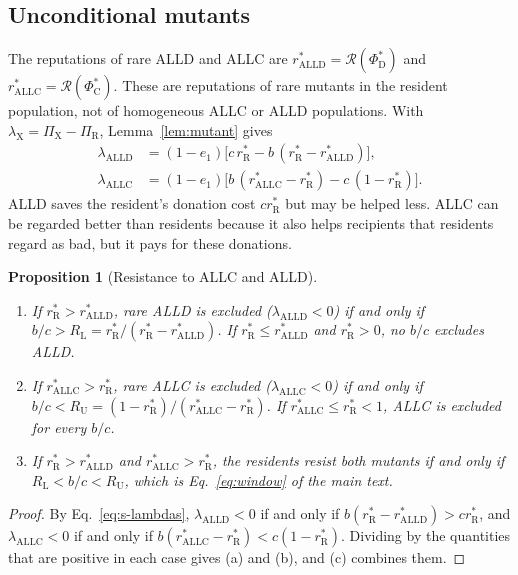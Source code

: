 \documentclass[10pt]{wlscirep}
\newcommand{\Rmap}{\mathscr{R}}            %
\newcommand{\rR}{r_{\mathrm{R}}^{*}}
\newcommand{\PhiCs}{\Phi^{*}_{\mathrm{C}}}
\newcommand{\PhiDs}{\Phi^{*}_{\mathrm{D}}}
\newcommand{\ALLC}{\mathrm{ALLC}}
\newcommand{\ALLD}{\mathrm{ALLD}}
\theoremstyle{plain}
\newtheorem{proposition}[lemma]{Proposition}
\theoremstyle{remark}
\begin{document}
\subsection{Unconditional mutants}
\label{si:unconditional}

The reputations of rare ALLD and ALLC are $r^*_{\ALLD}=\Rmap(\PhiDs)$ and $r^*_{\ALLC}=\Rmap(\PhiCs)$. These are reputations of rare mutants in the resident population, not of homogeneous ALLC or ALLD populations. With $\lambda_{\mathrm X}=\Pi_{\mathrm X}-\Pi_{\mathrm R}$, Lemma~\ref{lem:mutant} gives
\begin{equation}
\begin{aligned}
\lambda_{\ALLD}&=(1-e_1)\bigl[c\,\rR-b\,(\rR-r^*_{\ALLD})\bigr],\\
\lambda_{\ALLC}&=(1-e_1)\bigl[b\,(r^*_{\ALLC}-\rR)-c\,(1-\rR)\bigr].
\end{aligned}
\label{eq:s-lambdas}
\end{equation}
ALLD saves the resident's donation cost $c\rR$ but may be helped less. ALLC can be regarded better than residents because it also helps recipients that residents regard as bad, but it pays for these donations.

\begin{proposition}[Resistance to ALLC and ALLD]\label{prop:window}
\begin{enumerate}
\item[(a)] If $\rR>r^*_{\ALLD}$, rare ALLD is excluded ($\lambda_{\ALLD}<0$) if and only if $b/c>R_{\mathrm L}=\rR/(\rR-r^*_{\ALLD})$. If $\rR\leq r^*_{\ALLD}$ and $\rR>0$, no $b/c$ excludes ALLD.
\item[(b)] If $r^*_{\ALLC}>\rR$, rare ALLC is excluded ($\lambda_{\ALLC}<0$) if and only if $b/c<R_{\mathrm U}=(1-\rR)/(r^*_{\ALLC}-\rR)$. If $r^*_{\ALLC}\leq\rR<1$, ALLC is excluded for every $b/c$.
\item[(c)] If $\rR>r^*_{\ALLD}$ and $r^*_{\ALLC}>\rR$, the residents resist both mutants if and only if $R_{\mathrm L}<b/c<R_{\mathrm U}$, which is Eq.~\eqref{eq:window} of the main text.
\end{enumerate}
\end{proposition}
\begin{proof}
By Eq.~\eqref{eq:s-lambdas}, $\lambda_{\ALLD}<0$ if and only if $b(\rR-r^*_{\ALLD})>c\rR$, and $\lambda_{\ALLC}<0$ if and only if $b(r^*_{\ALLC}-\rR)<c(1-\rR)$. Dividing by the quantities that are positive in each case gives (a) and (b), and (c) combines them.
\end{proof}
\end{document}
